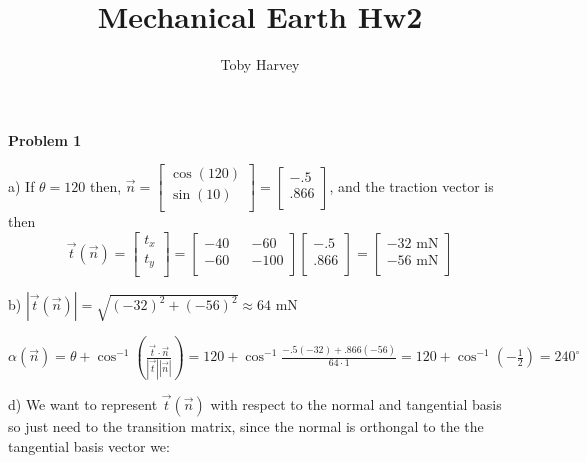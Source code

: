 \documentclass{article}
\begin{document}
\title{Mechanical Earth Hw2}
\author{Toby Harvey}
\maketitle
\noindent\textbf{Problem 1}

\noindent a) If $\theta = 120$ then, $ \vec{n} = \begin{bmatrix} \cos(120) \\ \sin(10)\\ \end{bmatrix} = \begin{bmatrix} -.5 \\ .866\\ \end{bmatrix}$, and the traction vector is then $$\vec{t}(\vec{n}) =
\begin{bmatrix}
  t_x\\
  t_y\\
\end{bmatrix}
= \begin{bmatrix}
  -40 && -60 \\
  -60 && -100 \\
\end{bmatrix}
\begin{bmatrix}
  -.5\\
  .866\\
\end{bmatrix}
=
\begin{bmatrix}
  -32 \text{ mN}\\
  -56 \text{ mN}\\
  \end{bmatrix}
$$

\vspace{3mm}

\noindent b) $|\vec{t}(\vec{n})| = \sqrt{(-32)^2 + (-56)^2} \approx 64 \text{ mN}$

\vspace{3mm}

\noindent $\alpha(\vec{n}) = \theta + \cos^{-1}\left(\frac{\vec{t}\cdot \vec{n}}{|\vec{t}||\vec{n}|}\right) = 120 + \cos^{-1}\frac{-.5(-32) + .866(-56)}{64 \cdot 1} = 120 + \cos^{-1}\left(-\frac{1}{2}\right) = 240^{\circ}$

\vspace{3mm}


\noindent d) We want to represent $\vec{t}(\vec{n})$  with respect to the normal and tangential  basis so just need to the transition matrix, since the normal is orthongal to the the tangential basis vector we:
\end{document}
